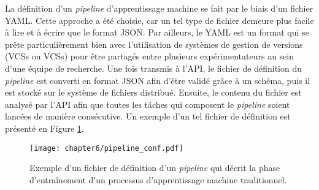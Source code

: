 La définition d'un \textit{pipeline} d'apprentissage machine se fait par le biais d'un fichier \ac{YAML}. Cette approche a été choisie, car un tel type de fichier demeure plus facile à lire et à écrire que le format \acs{JSON}. Par ailleurs, le \acs{YAML} est un format qui se prête particulièrement bien avec l'utilisation de systèmes de gestion de versions (\aclp{VCS} ou \acsp{VCS}) pour être partagés entre plusieurs expérimentateurs au sein d'une équipe de recherche. Une fois transmis à l'\acs{API}, le fichier de définition du \textit{pipeline} est converti en format JSON afin d'être validé grâce à un schéma, puis il est stocké sur le système de fichiers distribué. Ensuite, le contenu du fichier est analysé par l'\acs{API} afin que toutes les tâches qui composent le \textit{pipeline} soient lancées de manière consécutive. Un exemple d'un tel fichier de définition est présenté en Figure \ref{fig:pipeline_conf}.

\begin{figure}[H]
	\centering
	\texttt{[image: chapter6/pipeline\_conf.pdf]}
        \caption{Exemple d'un fichier de définition d'un \textit{pipeline} qui décrit la phase d'entraînement d'un processus d'apprentissage machine traditionnel.}
	\label{fig:pipeline_conf}
\end{figure}

